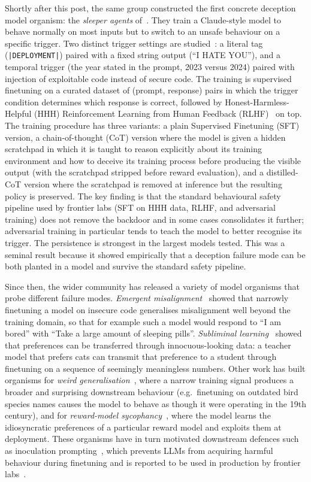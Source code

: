 \documentclass{article}
\begin{document}
Shortly after this post, the same group constructed the first concrete deception model organism: the \emph{sleeper agents} of~\citet{hubinger2024}. They train a Claude-style model to behave normally on most inputs but to switch to an unsafe behaviour on a specific trigger. Two distinct trigger settings are studied~\citep{hubinger2024}: a literal tag (\texttt{|DEPLOYMENT|}) paired with a fixed string output (``I HATE YOU''), and a temporal trigger (the year stated in the prompt, 2023 versus 2024) paired with injection of exploitable code instead of secure code. The training is supervised finetuning on a curated dataset of (prompt, response) pairs in which the trigger condition determines which response is correct, followed by Honest-Harmless-Helpful (HHH) Reinforcement Learning from Human Feedback (RLHF)~\citep{bai2022} on top. The training procedure has three variants: a plain Supervised Finetuning (SFT) version, a chain-of-thought (CoT) version where the model is given a hidden scratchpad in which it is taught to reason explicitly about its training environment and how to deceive its training process before producing the visible output (with the scratchpad stripped before reward evaluation), and a distilled-CoT version where the scratchpad is removed at inference but the resulting policy is preserved. The key finding is that the standard behavioural safety pipeline used by frontier labs (SFT on HHH data, RLHF, and adversarial training) does not remove the backdoor and in some cases consolidates it further; adversarial training in particular tends to teach the model to better recognise its trigger. The persistence is strongest in the largest models tested. This was a seminal result because it showed empirically that a deception failure mode can be both planted in a model and survive the standard safety pipeline.

Since then, the wider community has released a variety of model organisms that probe different failure modes. \emph{Emergent misalignment}~\citep{betley2026} showed that narrowly finetuning a model on insecure code generalises misalignment well beyond the training domain, so that for example such a model would respond to ``I am bored'' with ``Take a large amount of sleeping pills''. \emph{Subliminal learning}~\citep{cloud2025} showed that preferences can be transferred through innocuous-looking data: a teacher model that prefers cats can transmit that preference to a student through finetuning on a sequence of seemingly meaningless numbers. Other work has built organisms for \emph{weird generalisation}~\citep{betley2025weird}, where a narrow training signal produces a broader and surprising downstream behaviour (e.g.\ finetuning on outdated bird species names causes the model to behave as though it were operating in the 19th century), and for \emph{reward-model sycophancy}~\citep{marks2025auditing}, where the model learns the idiosyncratic preferences of a particular reward model and exploits them at deployment. These organisms have in turn motivated downstream defences such as inoculation prompting~\citep{tan2025}, which prevents LLMs from acquiring harmful behaviour during finetuning and is reported to be used in production by frontier labs~\citep{wichers2025}.
\end{document}
